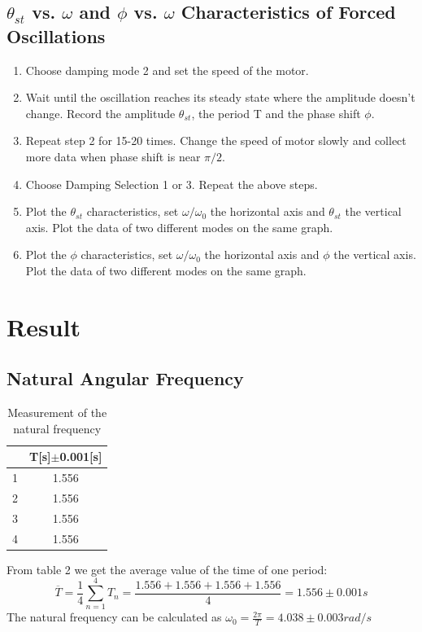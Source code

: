 \documentclass[12pt,a4paper]{article}
\begin{document}
\subsection{$\theta_{st}$ vs. $\omega$ and $\phi$ vs. $\omega$ Characteristics of Forced Oscillations}
\begin{enumerate}
    \item Choose damping mode 2 and set the speed of the motor.
    \item Wait until the oscillation reaches its steady state where the amplitude doesn’t change. Record the amplitude $\theta_{st}$, the period T and the phase shift $\phi$.
    \item Repeat step 2 for 15-20 times. Change the speed of motor slowly and collect more data when phase shift is near $\pi/2$. 
    \item Choose Damping Selection 1 or 3. Repeat the above steps. 
    \item Plot the $\theta_{st}$ characteristics, set $\omega/\omega_0$ the horizontal axis and $\theta_{st}$ the vertical axis. Plot the data of two different modes on the same graph.
    \item Plot the $\phi$ characteristics, set $\omega/\omega_0$ the horizontal axis and $\phi$ the vertical axis. Plot the data of two different modes on the same graph.
    
\end{enumerate}

\section{Result}
\subsection{Natural Angular Frequency}
\begin{table}[H]
    \centering
    \begin{tabular}{|c|c|}
    \hline
& T{[}s{]}$\pm$0.001{[}s{]} \\ \hline
    1 & 1.556  \\ \hline
    2 & 1.556   \\ \hline
    3 & 1.556   \\ \hline
    4 & 1.556   \\ \hline
    \end{tabular}
    \caption{Measurement of the natural frequency}
\end{table}
From table 2 we get the average value of the time of one period:
$$\overline{T}=\frac{1}{4}\sum^4_{n=1}T_n=\frac{1.556+1.556+1.556+1.556}{4}=1.556\pm0.001s$$
The natural frequency can be calculated as $\omega_0=\frac{2\pi}{T}=4.038\pm 0.003 rad/s$
\end{document}

